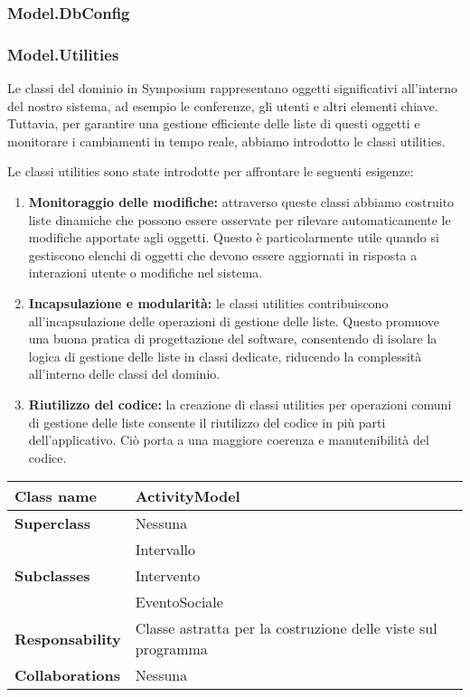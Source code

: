 \subsubsection{Model.DbConfig}
\subsubsection{Model.Utilities}
Le classi del dominio in Symposium rappresentano oggetti significativi all'interno del nostro sistema, ad esempio le conferenze, gli utenti e altri elementi chiave. Tuttavia, per garantire una gestione efficiente delle liste di questi oggetti e monitorare i cambiamenti in tempo reale, abbiamo introdotto le classi utilities.
\bigskip

Le classi utilities sono state introdotte per affrontare le seguenti esigenze:
\begin{enumerate}
	\item \textbf{Monitoraggio delle modifiche:} attraverso queste classi abbiamo costruito liste dinamiche che possono essere osservate per rilevare automaticamente le modifiche apportate agli oggetti. Questo è particolarmente utile quando si gestiscono elenchi di oggetti che devono essere aggiornati in risposta a interazioni utente o modifiche nel sistema.
	\item \textbf{Incapsulazione e modularità:} le classi utilities contribuiscono all'incapsulazione delle operazioni di gestione delle liste. Questo promuove una buona pratica di progettazione del software, consentendo di isolare la logica di gestione delle liste in classi dedicate, riducendo la complessità all'interno delle classi del dominio.
	\item \textbf{Riutilizzo del codice:} la creazione di classi utilities per operazioni comuni di gestione delle liste consente il riutilizzo del codice in più parti dell'applicativo. Ciò porta a una maggiore coerenza e manutenibilità del codice.
\end{enumerate}
\begin{table}[h!]
	\begin{tabular}{|l|l|}
		\hline 
		\textbf{Class name} & ActivityModel
		\\ \hline
		\textbf{Superclass} & Nessuna
		\\ \hline
		\multirow{3}{*}{\textbf{Subclasses}} & Intervallo \\
		& Intervento \\
		& EventoSociale \\ \hline
		\textbf{Responsability} & Classe astratta per la costruzione delle viste sul programma
		\\ \hline
		\multirow{1}{*}{\textbf{Collaborations}} & Nessuna
		\\ \hline
	\end{tabular}
\end{table}

